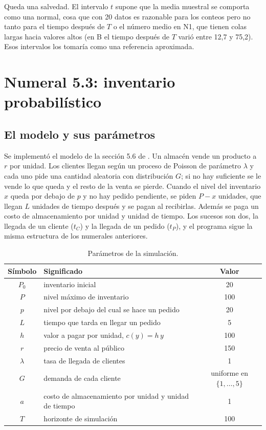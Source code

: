 \documentclass[11pt,letterpaper]{article}
\begin{document}
Queda una salvedad. El intervalo $t$ supone que la media muestral se comporta como una normal, cosa que con 20
datos es razonable para los conteos pero no tanto para el tiempo después de $T$ o el número medio en N1, que tienen
colas largas hacia valores altos (en B el tiempo después de $T$ varió entre 12,7 y 75,2). Esos intervalos los
tomaría como una referencia aproximada.

\section{Numeral 5.3: inventario probabilístico}

\subsection{El modelo y sus parámetros}

Se implementó el modelo de la sección 5.6 de \cite{rios08}. Un almacén vende un producto a $r$ por unidad. Los
clientes llegan según un proceso de Poisson de parámetro $\lambda$ y cada uno pide una cantidad aleatoria con
distribución $G$; si no hay suficiente se le vende lo que queda y el resto de la venta se pierde. Cuando el nivel
del inventario $x$ queda por debajo de $p$ y no hay pedido pendiente, se piden $P - x$ unidades, que llegan
$L$ unidades de tiempo después y se pagan al recibirlas. Además se paga un costo de almacenamiento por unidad y
unidad de tiempo. Los sucesos son dos, la llegada de un cliente ($t_C$) y la llegada de un pedido ($t_P$), y el
programa sigue la misma estructura de los numerales anteriores.

\begin{table}[H]
\centering
\caption{Parámetros de la simulación.}
\label{tab:53par}
\small
\begin{tabular}{@{}clc@{}}
\toprule
Símbolo & Significado & Valor \\
\midrule
$P_0$ & inventario inicial & 20 \\
$P$ & nivel máximo de inventario & 100 \\
$p$ & nivel por debajo del cual se hace un pedido & 20 \\
$L$ & tiempo que tarda en llegar un pedido & 5 \\
$h$ & valor a pagar por unidad, $c(y) = h\,y$ & 100 \\
$r$ & precio de venta al público & 150 \\
\midrule
$\lambda$ & tasa de llegada de clientes & 1 \\
$G$ & demanda de cada cliente & uniforme en $\{1, \dots, 5\}$ \\
$a$ & costo de almacenamiento por unidad y unidad de tiempo & 1 \\
$T$ & horizonte de simulación & 100 \\
\bottomrule
\end{tabular}
\end{table}
\end{document}
